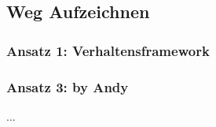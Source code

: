 \subsection{Weg Aufzeichnen}
\label{weg-aufzeichnen}

\subsubsection{Ansatz 1: Verhaltensframework}

\subsubsection{Ansatz 3: by Andy}
...
